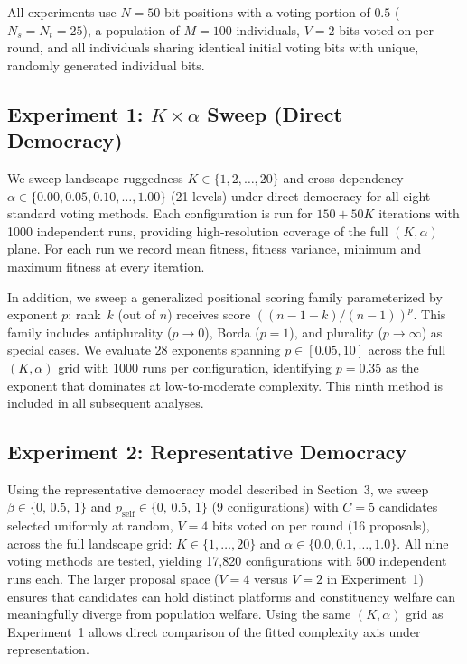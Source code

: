 All experiments use $N=50$ bit positions with a voting portion of $0.5$
($N_s = N_t = 25$), a population of $M=100$ individuals, $V=2$ bits voted on per
round, and all individuals sharing identical initial voting bits with unique,
randomly generated individual bits.

\subsection{Experiment 1: $K \times \alpha$ Sweep (Direct Democracy)}

We sweep landscape ruggedness $K \in \{1, 2, \ldots, 20\}$ and cross-dependency
$\alpha \in \{0.00, 0.05, 0.10, \ldots, 1.00\}$ (21 levels) under direct
democracy for all eight standard voting methods. Each configuration is run for
$150 + 50K$ iterations with 1000 independent runs, providing high-resolution
coverage of the full $(K, \alpha)$ plane. For each run we record mean fitness,
fitness variance, minimum and maximum fitness at every iteration.

In addition, we sweep a generalized positional scoring family parameterized by
exponent $p$: rank~$k$ (out of $n$) receives score $((n\!-\!1\!-\!k)/(n\!-\!1))^p$.
This family includes antiplurality ($p \to 0$), Borda ($p=1$), and plurality
($p \to \infty$) as special cases. We evaluate 28 exponents spanning
$p \in [0.05, 10]$ across the full $(K, \alpha)$ grid with 1000 runs per
configuration, identifying $p = 0.35$ as the exponent that dominates at
low-to-moderate complexity. This ninth method is included in all subsequent
analyses.

\subsection{Experiment 2: Representative Democracy}

\label{sec:exp2}

Using the representative democracy model described in Section~3, we sweep
$\beta \in \{0,\, 0.5,\, 1\}$ and $p_{\mathrm{self}} \in \{0,\, 0.5,\, 1\}$
(9 configurations) with $C=5$ candidates selected uniformly at random, $V=4$
bits voted on per round (16 proposals), across the full landscape grid:
$K \in \{1, \ldots, 20\}$ and $\alpha \in \{0.0, 0.1, \ldots, 1.0\}$.
All nine voting methods are tested, yielding 17{,}820 configurations with 500
independent runs each. The larger proposal space ($V=4$ versus $V=2$ in
Experiment~1) ensures that candidates can hold distinct platforms and
constituency welfare can meaningfully diverge from population welfare. Using
the same $(K, \alpha)$ grid as Experiment~1 allows direct comparison of the
fitted complexity axis under representation.

